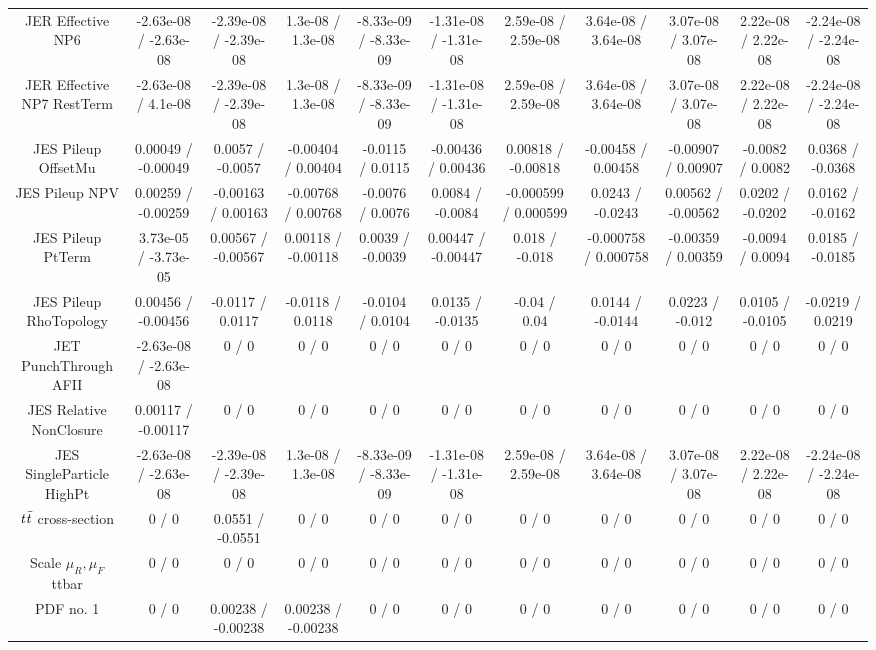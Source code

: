 {\begin{landscape}
\begin{longtable}{@{\extracolsep{\fill}}| *{11}{c|}}
  JER Effective NP6 & -2.63e-08 / -2.63e-08 & -2.39e-08 / -2.39e-08 & 1.3e-08 / 1.3e-08 & -8.33e-09 / -8.33e-09 & -1.31e-08 / -1.31e-08 & 2.59e-08 / 2.59e-08 & 3.64e-08 / 3.64e-08 & 3.07e-08 / 3.07e-08 & 2.22e-08 / 2.22e-08 & -2.24e-08 / -2.24e-08 \\ 
  JER Effective NP7 RestTerm & -2.63e-08 / 4.1e-08 & -2.39e-08 / -2.39e-08 & 1.3e-08 / 1.3e-08 & -8.33e-09 / -8.33e-09 & -1.31e-08 / -1.31e-08 & 2.59e-08 / 2.59e-08 & 3.64e-08 / 3.64e-08 & 3.07e-08 / 3.07e-08 & 2.22e-08 / 2.22e-08 & -2.24e-08 / -2.24e-08 \\ 
  JES Pileup OffsetMu & 0.00049 / -0.00049 & 0.0057 / -0.0057 & -0.00404 / 0.00404 & -0.0115 / 0.0115 & -0.00436 / 0.00436 & 0.00818 / -0.00818 & -0.00458 / 0.00458 & -0.00907 / 0.00907 & -0.0082 / 0.0082 & 0.0368 / -0.0368 \\ 
  JES Pileup NPV & 0.00259 / -0.00259 & -0.00163 / 0.00163 & -0.00768 / 0.00768 & -0.0076 / 0.0076 & 0.0084 / -0.0084 & -0.000599 / 0.000599 & 0.0243 / -0.0243 & 0.00562 / -0.00562 & 0.0202 / -0.0202 & 0.0162 / -0.0162 \\ 
  JES Pileup PtTerm & 3.73e-05 / -3.73e-05 & 0.00567 / -0.00567 & 0.00118 / -0.00118 & 0.0039 / -0.0039 & 0.00447 / -0.00447 & 0.018 / -0.018 & -0.000758 / 0.000758 & -0.00359 / 0.00359 & -0.0094 / 0.0094 & 0.0185 / -0.0185 \\ 
  JES Pileup RhoTopology & 0.00456 / -0.00456 & -0.0117 / 0.0117 & -0.0118 / 0.0118 & -0.0104 / 0.0104 & 0.0135 / -0.0135 & -0.04 / 0.04 & 0.0144 / -0.0144 & 0.0223 / -0.012 & 0.0105 / -0.0105 & -0.0219 / 0.0219 \\ 
  JET PunchThrough AFII & -2.63e-08 / -2.63e-08 & 0 / 0 & 0 / 0 & 0 / 0 & 0 / 0 & 0 / 0 & 0 / 0 & 0 / 0 & 0 / 0 & 0 / 0 \\ 
  JES Relative NonClosure & 0.00117 / -0.00117 & 0 / 0 & 0 / 0 & 0 / 0 & 0 / 0 & 0 / 0 & 0 / 0 & 0 / 0 & 0 / 0 & 0 / 0 \\ 
  JES SingleParticle HighPt & -2.63e-08 / -2.63e-08 & -2.39e-08 / -2.39e-08 & 1.3e-08 / 1.3e-08 & -8.33e-09 / -8.33e-09 & -1.31e-08 / -1.31e-08 & 2.59e-08 / 2.59e-08 & 3.64e-08 / 3.64e-08 & 3.07e-08 / 3.07e-08 & 2.22e-08 / 2.22e-08 & -2.24e-08 / -2.24e-08 \\ 
$  \it{t\bar{t}}$ cross-section & 0 / 0 & 0.0551 / -0.0551 & 0 / 0 & 0 / 0 & 0 / 0 & 0 / 0 & 0 / 0 & 0 / 0 & 0 / 0 & 0 / 0 \\ 
  Scale $ \mu_{R},\mu_{F}$ ttbar & 0 / 0 & 0 / 0 & 0 / 0 & 0 / 0 & 0 / 0 & 0 / 0 & 0 / 0 & 0 / 0 & 0 / 0 & 0 / 0 \\ 
  PDF no. 1 & 0 / 0 & 0.00238 / -0.00238 & 0.00238 / -0.00238 & 0 / 0 & 0 / 0 & 0 / 0 & 0 / 0 & 0 / 0 & 0 / 0 & 0 / 0 \\ 

\end{longtable}
\end{landscape}}
